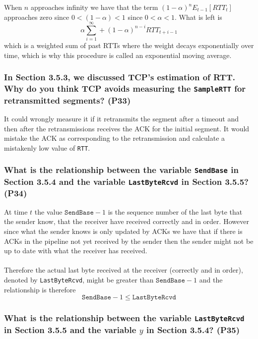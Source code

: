 When $n$ approaches infinity we have that the term $(1 - \alpha)^n E_{t-1}[RTT_t]$ approaches zero since $0 < (1 - \alpha) < 1$ since $0 < \alpha < 1 $. What is left is 
\begin{equation*}
    \alpha\sum_{i=1}^{\infty} + (1 - \alpha)^{n-i}  RTT_{t+i-1}
\end{equation*}
which is a weighted sum of past RTTs where the weight decays exponentially over time, which is why this procedure is called an exponential moving average. 



\subsubsection{In Section 3.5.3, we discussed TCP's estimation of RTT. Why do you think TCP avoids measuring the \texttt{SampleRTT} for retransmitted segments? (P33)}

It could wrongly measure it if it retransmits the segment after a timeout and then after the retransmissions receives the ACK for the initial segment. It would mistake the ACK as corresponding to the retransmission and calculate a mistakenly low value of \texttt{RTT}.



\subsubsection{What is the relationship between the variable \texttt{SendBase} in Section 3.5.4 and the variable \texttt{LastByteRcvd} in Section 3.5.5? (P34)}

At time $t$ the value $\texttt{SendBase} - 1$ is the sequence number of the last byte that the sender know, that the receiver have received correctly and in order. However since what the sender knows is only updated by ACKs we have that if there is ACKs in the pipeline not yet received by the sender then the sender might not be up to date with what the receiver has received. \\
\\
Therefore the actual last byte received at the receiver (correctly and in order), denoted by \texttt{LastByteRcvd}, might be greater than $\texttt{SendBase} - 1$ and the relationship is therefore
\begin{equation*}
    \texttt{SendBase} - 1 \leq \texttt{LastByteRcvd}
\end{equation*}



\subsubsection{What is the relationship between the variable \texttt{LastByteRcvd} in Section 3.5.5 and the variable $y$ in Section 3.5.4? (P35)}

